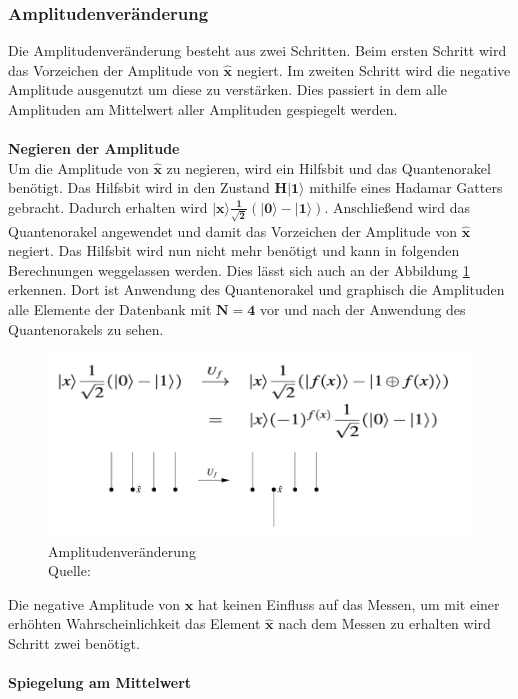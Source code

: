 \subsubsection{Amplitudenveränderung}
Die Amplitudenveränderung besteht aus zwei Schritten. Beim ersten Schritt wird das Vorzeichen der Amplitude von $\mathbf{\hat x}$ negiert. Im zweiten Schritt wird die negative Amplitude ausgenutzt um diese zu verstärken. Dies passiert in dem alle Amplituden am Mittelwert aller Amplituden gespiegelt werden. 
\\ \\
\textbf{Negieren der Amplitude}
 \\
Um die Amplitude von $\mathbf{\hat x}$ zu negieren, wird ein Hilfsbit und das Quantenorakel benötigt. Das Hilfsbit wird in den Zustand $\mathbf{H|1\rangle}$ mithilfe eines Hadamar Gatters gebracht. Dadurch erhalten wird $\mathbf{|x\rangle \frac{1}{\sqrt 2}(|0\rangle - |1\rangle )}$. Anschließend wird das Quantenorakel angewendet und damit das Vorzeichen der Amplitude von $\mathbf{\hat{x}}$ negiert. Das Hilfsbit wird nun nicht mehr benötigt und kann in folgenden Berechnungen weggelassen werden. Dies lässt sich auch an der Abbildung \ref{fig:changeAmplitude} erkennen. Dort ist Anwendung des Quantenorakel und graphisch die Amplituden alle Elemente der Datenbank mit $\mathbf{N=4}$ vor und nach der Anwendung des Quantenorakels zu sehen.
\begin{figure}[hbtp]
	\centering
	\includegraphics[width=.8\textwidth]{figures/amplitudenveraenderung.png}
	\caption{Amplitudenveränderung \\ Quelle: \cite[S. 141]{Ho17}}
	\label{fig:changeAmplitude}
\end{figure}
Die negative Amplitude von $\mathbf{\hat x}$ hat keinen Einfluss auf das Messen, um mit einer erhöhten Wahrscheinlichkeit das Element $\mathbf{\hat x}$ nach dem Messen zu erhalten wird Schritt zwei benötigt.
\\\\
\textbf{Spiegelung am Mittelwert} \\
\label{sec:spiegelnAmMittelwert} 
